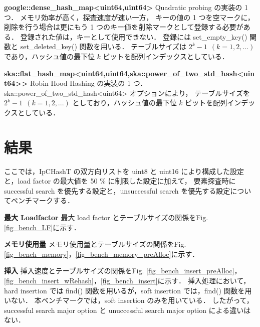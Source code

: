 %
{\bf google::dense\_hash\_map<uint64,uint64>}
\samepage\newline\indent
Quadratic probing の実装の 1 つ．
メモリ効率が高く，探査速度が速い一方，
キーの値の 1 つを空マークに，削除を行う場合は更にもう 1 つのキー値を削除マークとして登録する必要がある．
登録された値は，キーとして使用できない．
登録には set\_empty\_key() 関数と set\_deleted\_key() 関数を用いる．
テーブルサイズは $2^k-1\ \ (k=1,2,...)$ であり，ハッシュ値の最下位 $k$ ビットを配列インデックスとしている．
\leavevmode \newline

%
{\bf ska::flat\_hash\_map<uint64,uint64,ska::power\_of\_two\_std\_hash<uint64>>}
\samepage\newline\indent
Robin Hood Hashing の実装の 1 つ．
ska::power\_of\_two\_std\_hash<uint64> オプションにより，
テーブルサイズを $2^k-1\ \ (k=1,2,...)$ としており，ハッシュ値の最下位 $k$ ビットを配列インデックスとしている．
\leavevmode \newline


\section{結果}
ここでは，IpCHashT の双方向リストを uint8 と uint16 により構成した設定と，load factor の最大値を 50 \% に制限した設定に加えて，
要素探査時に successful search を優先する設定と，unsuccessful search を優先する設定についてベンチマークする．
\leavevmode \newline

%
{\bf 最大 Loadfactor}
\samepage\newline\indent
最大 load factor とテーブルサイズの関係をFig. \ref{fig_bench_LF}に示す．
\leavevmode \newline

%
{\bf メモリ使用量}
\samepage\newline\indent
メモリ使用量とテーブルサイズの関係をFig. \ref{fig_bench_memory}，\ref{fig_bench_memory_preAlloc}に示す．
\leavevmode \newline

%
{\bf 挿入}
\samepage\newline\indent
挿入速度とテーブルサイズの関係をFig. 
\ref{fig_bench_insert_preAlloc}，\ref{fig_bench_insert_wRehash}，\ref{fig_bench_insert}に示す．
挿入処理において，hard insertion では find() 関数を用いるが，soft insertion では，find() 関数を用いない．
本ベンチマークでは，soft insertion のみを用いている．
したがって，successful search major option と unuccessful search major option による違いはない．
\leavevmode \newline


